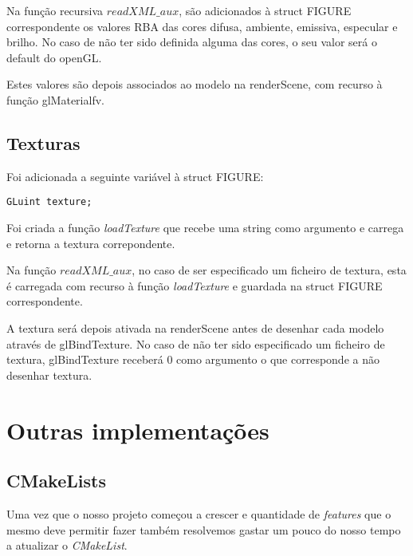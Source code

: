 \documentclass[11pt,a4paper]{report}
\begin{document}
Na função recursiva {$readXML\_aux$}, são adicionados à struct FIGURE correspondente os valores RBA das cores difusa, ambiente, emissiva, especular e brilho.
No caso de não ter sido definida alguma das cores, o seu valor será o default do openGL.

Estes valores são depois associados ao modelo na renderScene, com recurso à função glMaterialfv.

\subsection{Texturas}
Foi adicionada a seguinte variável à struct FIGURE:

\begin{lstlisting}[style = code]
GLuint texture;
\end{lstlisting}

Foi criada a função \emph{loadTexture} que recebe uma string como argumento e carrega e retorna a textura correpondente.

Na função {$readXML\_aux$}, no caso de ser especificado um ficheiro de textura, esta é carregada com recurso à função \emph{loadTexture} e guardada na struct FIGURE correspondente.

A textura será depois ativada na renderScene antes de desenhar cada modelo através de glBindTexture. No caso de não ter sido especificado um ficheiro de textura, glBindTexture receberá 0 como argumento o que corresponde a não desenhar textura.

\section{Outras implementações}

\subsection{CMakeLists}

Uma vez que o nosso projeto começou a crescer e quantidade de \emph{features} que o mesmo deve permitir fazer também resolvemos gastar um pouco do nosso tempo a atualizar o \emph{CMakeList}. 
\end{document}
